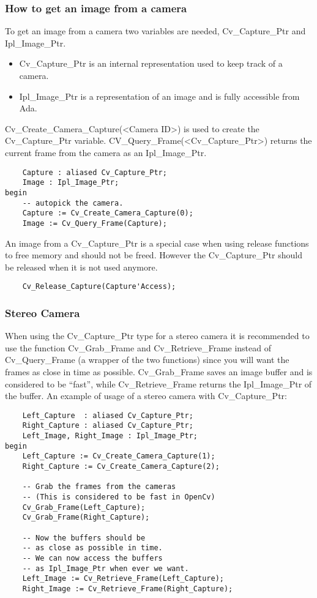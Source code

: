 \subsubsection{How to get an image from a camera}
To get an image from a camera two variables are needed, Cv_Capture_Ptr and Ipl_Image_Ptr. 
\begin{itemize}
\item Cv_Capture_Ptr is an internal representation used to keep track of a camera.
\item Ipl_Image_Ptr is a representation of an image and is fully accessible from Ada. 
\end{itemize}
Cv_Create_Camera_Capture(<Camera ID>) is used to create the Cv_Capture_Ptr variable.
CV_Query_Frame(<Cv_Capture_Ptr>) returns the current frame from the camera as an Ipl_Image_Ptr.
\begin{lstlisting}
	Capture : aliased Cv_Capture_Ptr;
	Image : Ipl_Image_Ptr;
begin
	-- autopick the camera.
	Capture := Cv_Create_Camera_Capture(0); 
	Image := Cv_Query_Frame(Capture);
\end{lstlisting}
An image from a Cv_Capture_Ptr is a special case when using release functions to free memory and should not be freed. However the Cv_Capture_Ptr should be released when it is not used anymore.
\begin{lstlisting}
	Cv_Release_Capture(Capture'Access);
\end{lstlisting}
\subsubsection*{Stereo Camera}
When using the Cv_Capture_Ptr type for a stereo camera it is recommended to use the function Cv_Grab_Frame and Cv_Retrieve_Frame instead of Cv_Query_Frame (a wrapper of the two functions) since you will want the frames as close in time as possible. 
Cv_Grab_Frame saves an image buffer and is considered to be ``fast'', while Cv_Retrieve_Frame returns the Ipl_Image_Ptr of the buffer.
An example of usage of a stereo camera with Cv_Capture_Ptr:
\begin{lstlisting}
	Left_Capture  : aliased Cv_Capture_Ptr;
	Right_Capture : aliased Cv_Capture_Ptr;
	Left_Image, Right_Image : Ipl_Image_Ptr;
begin
	Left_Capture := Cv_Create_Camera_Capture(1);	
	Right_Capture := Cv_Create_Camera_Capture(2);

	-- Grab the frames from the cameras 
	-- (This is considered to be fast in OpenCv)
	Cv_Grab_Frame(Left_Capture);
	Cv_Grab_Frame(Right_Capture);

	-- Now the buffers should be 
	-- as close as possible in time.
	-- We can now access the buffers 
	-- as Ipl_Image_Ptr when ever we want.
	Left_Image := Cv_Retrieve_Frame(Left_Capture);
	Right_Image := Cv_Retrieve_Frame(Right_Capture);
\end{lstlisting}

